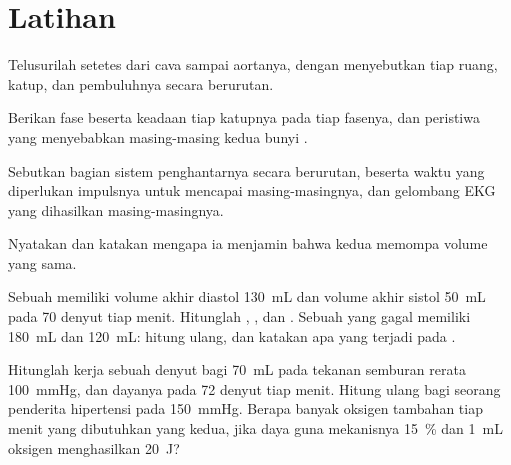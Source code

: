 \section{Latihan}

\begin{exercise}[$\star$]\label{exo:b2:heart:1}
Telusurilah setetes  dari  cava sampai aortanya, dengan
menyebutkan tiap ruang, katup, dan pembuluhnya secara berurutan.
\end{exercise}

\begin{exercise}[$\star$]\label{exo:b2:heart:2}
Berikan fase  beserta keadaan tiap katupnya pada tiap
fasenya, dan peristiwa yang menyebabkan masing-masing kedua bunyi
.
\end{exercise}

\begin{exercise}[$\star$]\label{exo:b2:heart:3}
Sebutkan bagian sistem penghantarnya secara berurutan, beserta waktu
yang diperlukan impulsnya untuk mencapai masing-masingnya, dan
gelombang EKG yang dihasilkan masing-masingnya.
\end{exercise}

\begin{exercise}[$\star$]\label{exo:b2:heart:4}
Nyatakan  dan katakan mengapa ia menjamin bahwa
kedua  memompa volume yang sama.
\end{exercise}

\begin{exercise}[$\star\star$]\label{exo:b2:heart:5}
Sebuah  memiliki volume akhir diastol \qty{130}{mL} dan volume
akhir sistol \qty{50}{mL} pada 70 denyut tiap menit. Hitunglah , , dan . Sebuah 
yang gagal memiliki \qty{180}{mL} dan \qty{120}{mL}: hitung ulang, dan
katakan apa yang terjadi pada .
\end{exercise}

\begin{exercise}[$\star\star$]\label{exo:b2:heart:6}
Hitunglah kerja sebuah denyut bagi  \qty{70}{mL} pada
tekanan semburan rerata \qty{100}{mmHg}, dan dayanya pada 72 denyut
tiap menit. Hitung ulang bagi seorang penderita hipertensi pada
\qty{150}{mmHg}. Berapa banyak oksigen tambahan tiap menit yang
dibutuhkan  yang kedua, jika daya guna mekanisnya \qty{15}{\%}
dan \qty{1}{mL} oksigen menghasilkan \qty{20}{J}?
\end{exercise}

